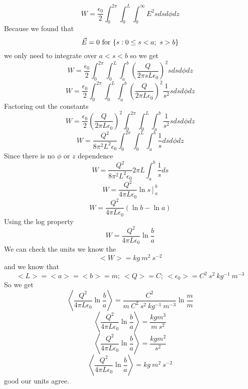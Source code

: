 \documentclass[11pt]{article}
\numberwithin{equation}{section}
\newcommand{\vecE}{\vec{E}}
\begin{document}
\begin{enumerate}[(a)]
\begin{enumerate}[(i)]
$$W = \frac{\epsilon_0}{2} \int_0^{2\pi}\int_0^{L}\int_0^{\infty} E^2 sdsd\phi dz$$
Because we found that 
$$\vecE = 0\ \textnormal{for}\ \{s: 0\le s<a;\ s>b\}$$
we only need to integrate over $a<s<b$ so we get
$$W = \frac{\epsilon_0}{2} \int_0^{2\pi}\int_0^{L}\int_a^b \left(\frac{Q}{2\pi sL\epsilon_0}\right)^2 sdsd\phi dz$$
$$W = \frac{\epsilon_0}{2} \int_0^{2\pi}\int_0^{L}\int_a^b \left(\frac{Q}{2\pi L\epsilon_0}\right)^2\frac{1}{s^2} sdsd\phi dz$$
Factoring out the constants
$$W = \frac{\epsilon_0}{2} \left(\frac{Q}{2\pi L\epsilon_0}\right)^2 \int_0^{2\pi}\int_0^{L}\int_a^b \frac{1}{s^2} sdsd\phi dz$$
$$W = \frac{Q^2}{8\pi^2 L^2\epsilon_0} \int_0^{2\pi}\int_0^{L}\int_a^b \frac{1}{s}dsd\phi dz$$
Since there is no $\phi$ or $z$ dependence
$$W = \frac{Q^2}{8\pi^2 L^2\epsilon_0} 2\pi L\int_a^b \frac{1}{s}ds$$
$$W = \frac{Q^2}{4\pi L\epsilon_0}\left.\ln{s}\right]_a^b$$
$$W = \frac{Q^2}{4\pi L\epsilon_0}\left(\ln{b} - \ln{a}\right)$$
Using the log property
$$W = \frac{Q^2}{4\pi L\epsilon_0}\ln{\frac{b}{a}}$$
We can check the units we know the $$<W> = kg\ m^2\ s^{-2}$$
and we know that
$$<L>=<a>=<b>=m;\ <Q>=C;\ <\epsilon_0> = C^2\ s^2\ kg^{-1}\ m^{-3}$$
So we get 
$$\left<\frac{Q^2}{4\pi L\epsilon_0}\ln{\frac{b}{a}}\right> = \frac{C^2}{m\ C^2\ s^2\ kg^{-1}\ m^{-3}}\ln{\frac{m}{m}}$$
$$\left<\frac{Q^2}{4\pi L\epsilon_0}\ln{\frac{b}{a}}\right> = \frac{kg m^3}{m\ s^2}$$
$$\left<\frac{Q^2}{4\pi L\epsilon_0}\ln{\frac{b}{a}}\right> = \frac{kg m^2}{ s^2}$$
$$\left<\frac{Q^2}{4\pi L\epsilon_0}\ln{\frac{b}{a}}\right> = kg\ m^2\ s^{-2}$$
good our units agree.


\end{enumerate}
\end{enumerate}
\end{document}
